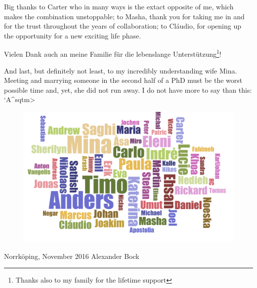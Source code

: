 Big thanks to Carter who in many ways is the extact opposite of me, which makes the combination unstoppable; to Masha, thank you for taking me in and for the trust throughout the years of collaboration; to Cl\'audio, for opening up the opportunity for a new exciting life phase.

Vielen Dank auch an meine Familie f\"ur die lebenslange Unterst\"utzung\footnote{Thanks also to my family for the lifetime support}!

And last, but definitely not least, to my incredibly understanding wife Mina. Meeting and marrying someone in the second half of a PhD must be the worst possible time and, yet, she did not run away. I do not have more to say than this: \<`A^sqtm>

\begin{figure}[hb]
\centering
\includegraphics[width=\linewidth]{figures/misc/wordcloud.pdf}
\end{figure}

\vfill
\hline
\hline

Norrk\"oping, November 2016 \hfill Alexander Bock
\vspace{2cm}
